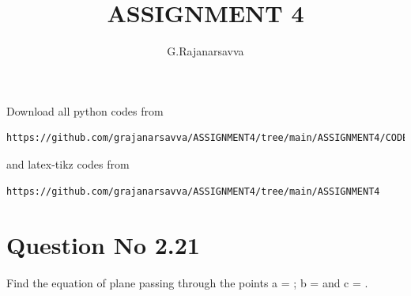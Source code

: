 \documentclass[journal,12pt,twocolumn]{IEEEtran}
\begin{document}
     \def\rightbox#1{\makebox[0in][r]{#1}}
     \def\centbox#1{\makebox[0in]{#1}}
     \def\topbox#1{\raisebox{-\baselineskip}[0in][0in]{#1}}
     \def\midbox#1{\raisebox{-0.5\baselineskip}[0in][0in]{#1}}
\vspace{3cm}
\title{ASSIGNMENT 4}
\author{G.Rajanarsavva}
\maketitle
\newpage
\bigskip
\renewcommand{\thefigure}{\theenumi}
\renewcommand{\thetable}{\theenumi}
Download all python codes from 
\begin{lstlisting}
https://github.com/grajanarsavva/ASSIGNMENT4/tree/main/ASSIGNMENT4/CODES
\end{lstlisting}
%
and latex-tikz codes from 
%
\begin{lstlisting}
https://github.com/grajanarsavva/ASSIGNMENT4/tree/main/ASSIGNMENT4
\end{lstlisting}
%
\section{Question No 2.21}
Find the equation of plane passing through the points
a =  ; b =  and c =  .
% 
\end{document}
